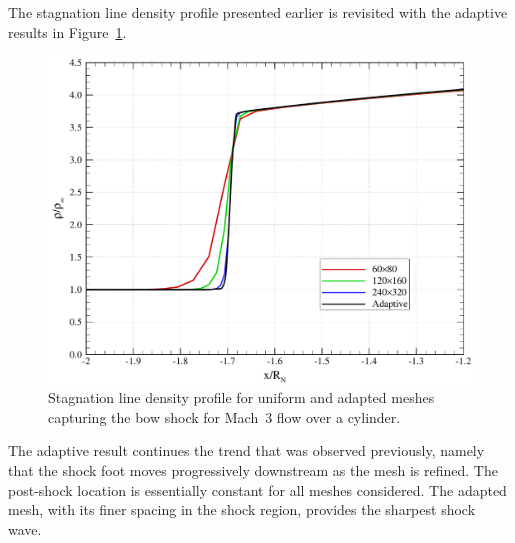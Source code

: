 The stagnation line density profile presented earlier is revisited with the adaptive results in Figure~\ref{fig:cyl_amr_rho_stagline}.
\begin{figure}[hbtp]
  \begin{center}
    \includegraphics[width=\textwidth]{figures/mach3_cylinder/rho_amr_mesh_convergence}
    \caption{Stagnation line density profile for uniform and adapted meshes capturing the bow shock for Mach~3 flow over a cylinder.\label{fig:cyl_amr_rho_stagline}}
  \end{center}
\end{figure}
The adaptive result continues the trend that was observed previously, namely that the shock foot moves progressively downstream as the mesh is refined.  The post-shock location is essentially constant for all meshes considered.  The adapted mesh, with its finer spacing in the shock region, provides the sharpest shock wave.




